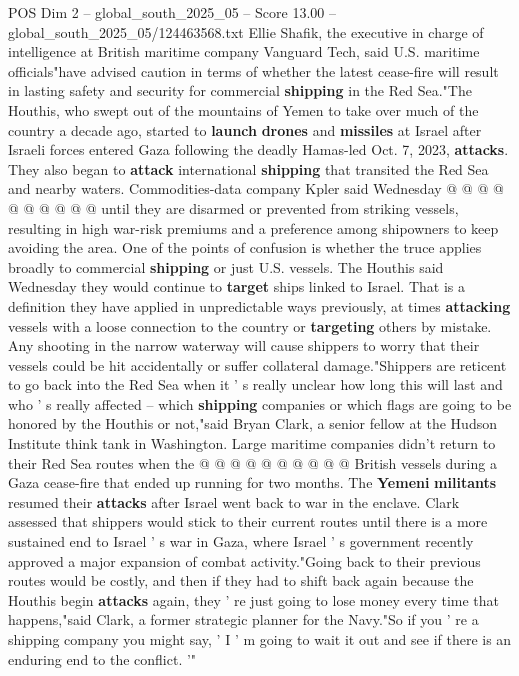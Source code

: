 \begin{textsample}{POS Dim 2 – global\_south\_2025\_05 – Score 13.00 – global\_south\_2025\_05/124463568.txt}
Ellie Shafik, the executive in charge of intelligence at British maritime company Vanguard Tech, said U.S. maritime officials"have advised caution in terms of whether the latest cease-fire will result in lasting safety and security for commercial \textbf{shipping} in the Red Sea."The Houthis, who swept out of the mountains of Yemen to take over much of the country a decade ago, started to \textbf{launch} \textbf{drones} and \textbf{missiles} at Israel after Israeli forces entered Gaza following the deadly Hamas-led Oct. 7, 2023, \textbf{attacks}.
They also began to \textbf{attack} international \textbf{shipping} that transited the Red Sea and nearby waters.
Commodities-data company Kpler said Wednesday @ @ @ @ @ @ @ @ @ @ until they are disarmed or prevented from striking vessels, resulting in high war-risk premiums and a preference among shipowners to keep avoiding the area.
One of the points of confusion is whether the truce applies broadly to commercial \textbf{shipping} or just U.S. vessels.
The Houthis said Wednesday they would continue to \textbf{target} ships linked to Israel.
That is a definition they have applied in unpredictable ways previously, at times \textbf{attacking} vessels with a loose connection to the country or \textbf{targeting} others by mistake.
Any shooting in the narrow waterway will cause shippers to worry that their vessels could be hit accidentally or suffer collateral damage."Shippers are reticent to go back into the Red Sea when it ' s really unclear how long this will last and who ' s really affected -- which \textbf{shipping} companies or which flags are going to be honored by the Houthis or not,"said Bryan Clark, a senior fellow at the Hudson Institute think tank in Washington.
Large maritime companies didn't return to their Red Sea routes when the @ @ @ @ @ @ @ @ @ @ British vessels during a Gaza cease-fire that ended up running for two months.
The \textbf{Yemeni} \textbf{militants} resumed their \textbf{attacks} after Israel went back to war in the enclave.
Clark assessed that shippers would stick to their current routes until there is a more sustained end to Israel ' s war in Gaza, where Israel ' s government recently approved a major expansion of combat activity."Going back to their previous routes would be costly, and then if they had to shift back again because the Houthis begin \textbf{attacks} again, they ' re just going to lose money every time that happens,"said Clark, a former strategic planner for the Navy."So if you ' re a shipping company you might say, ' I ' m going to wait it out and see if there is an enduring end to the conflict. '"

\end{textsample}
